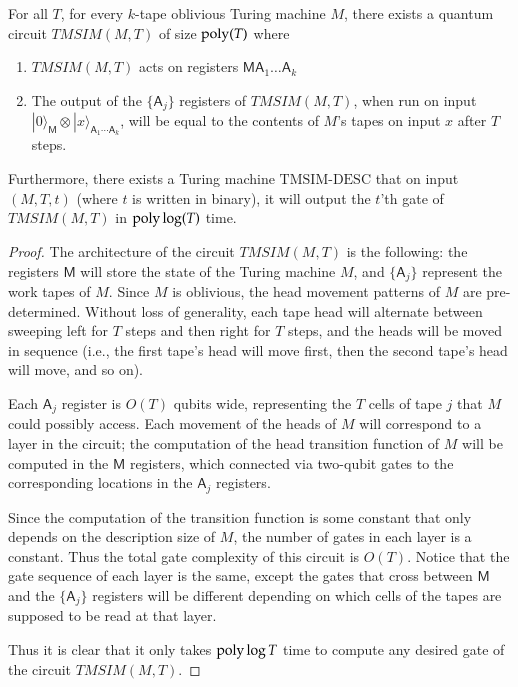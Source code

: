 \documentclass[11pt,letterpaper]{article}
\newcommand{\ket}[1]{|#1\rangle}
\newcommand{\sM}{{\mathsf{M}}}
\newcommand{\sA}{{\mathsf{A}}}
\begin{document}
\begin{lemma}\label{lem:tmsim}
	For all $T$, for every $k$-tape oblivious Turing machine $M$, there exists a quantum circuit $TMSIM(M,T)$ of size $\operatorname{poly}(T)$ where
	\begin{enumerate}
		\item $TMSIM(M,T)$ acts on registers $\sM \sA_1 \ldots \sA_k$
		\item The output of the $\{\sA_j\}$ registers of $TMSIM(M,T)$, when run on input $\ket{0}_{\sM} \otimes \ket{x}_{\sA_1 \cdots \sA_k}$, will be equal to the contents of $M$'s tapes on input $x$ after $T$ steps.
	\end{enumerate}
	Furthermore, there exists a Turing machine $\text{TMSIM-DESC}$ that on input $(M,T,t)$ (where $t$ is written in binary), it will output the $t$'th gate of $TMSIM(M,T)$ in $\operatorname{poly}\log(T)$ time. 
\end{lemma}

\begin{proof}
	The architecture of the circuit $TMSIM(M,T)$ is the following: the registers $\sM$ will store the state of the Turing machine $M$, and $\{\sA_j\}$ represent the work tapes of $M$. Since $M$ is oblivious, the head movement patterns of $M$ are pre-determined. Without loss of generality, each tape head will alternate between sweeping left for $T$ steps and then right for $T$ steps, and the heads will be moved in sequence (i.e., the first tape's head will move first, then the second tape's head will move, and so on). 
	
	Each $\sA_j$ register is $O(T)$ qubits wide, representing the $T$ cells of tape $j$ that $M$ could possibly access. Each movement of the heads of $M$ will correspond to a layer in the circuit; the computation of the head transition function of $M$ will be computed in the $\sM$ registers, which connected via two-qubit gates to the corresponding locations in the $\sA_j$ registers. 
	
	Since the computation of the transition function is some constant that only depends on the description size of $M$, the number of gates in each layer is a constant. Thus the total gate complexity of this circuit is $O(T)$. Notice that the gate sequence of each layer is the same, except the gates that cross between $\sM$ and the $\{\sA_j\}$ registers will be different depending on which cells of the tapes are supposed to be read at that layer. 
	
	Thus it is clear that it only takes $\operatorname{poly}\log T$ time to compute any desired gate of the circuit $TMSIM(M,T)$.
\end{proof}
\end{document}
